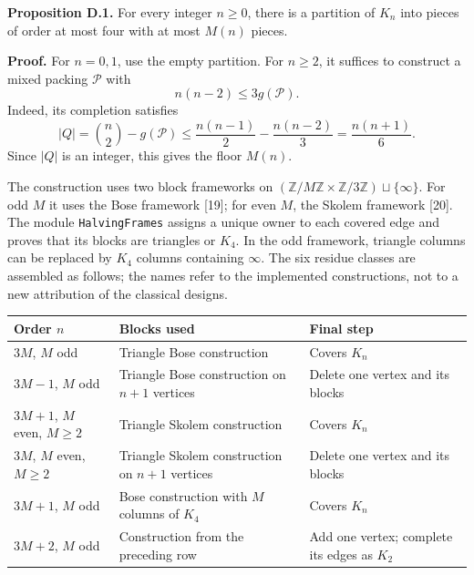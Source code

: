 \documentclass[english,11pt,a4paper]{article}
\newcounter{none}
\begin{document}
\textbf{Proposition D.1.} For every integer \(n\ge0\), there is a partition of \(K_n\) into pieces of order at most four with at most \(M(n)\) pieces.

\textbf{Proof.} For \(n=0,1\), use the empty partition. For \(n\ge2\), it suffices to construct a mixed packing \(\mathcal P\) with \[
n(n-2)\le3g(\mathcal P).
\tag{D.1}
\] Indeed, its completion satisfies \[
|Q|=\binom n2-g(\mathcal P)
\le\frac{n(n-1)}2-\frac{n(n-2)}3
=\frac{n(n+1)}6.
\tag{D.2}
\] Since \(|Q|\) is an integer, this gives the floor \(M(n)\).

The construction uses two block frameworks on \((\mathbb Z/M\mathbb Z\times\mathbb Z/3\mathbb Z)\sqcup\{\infty\}\). For odd \(M\) it uses the Bose framework {[}19{]}; for even \(M\), the Skolem framework {[}20{]}. The module \nolinkurl{HalvingFrames} assigns a unique owner to each covered edge and proves that its blocks are triangles or \(K_4\). In the odd framework, triangle columns can be replaced by \(K_4\) columns containing \(\infty\). The six residue classes are assembled as follows; the names refer to the implemented constructions, not to a new attribution of the classical designs.


{\def\LTcaptype{none} %
\begin{longtable}[c]{@{}
  >{\raggedright\arraybackslash}p{}
  >{\raggedright\arraybackslash}p{}
  >{\raggedright\arraybackslash}p{}@{}}
\toprule\noalign{}
\begin{minipage}[b]{\linewidth}\raggedright
Order \(n\)
\end{minipage} & \begin{minipage}[b]{\linewidth}\raggedright
Blocks used
\end{minipage} & \begin{minipage}[b]{\linewidth}\raggedright
Final step
\end{minipage} \\
\midrule\noalign{}
\endhead
\bottomrule\noalign{}
\endlastfoot
\(3M\), \(M\) odd & Triangle Bose construction & Covers \(K_n\) \\
\(3M-1\), \(M\) odd & Triangle Bose construction on \(n+1\) vertices & Delete one vertex and its blocks \\
\(3M+1\), \(M\) even, \(M\ge2\) & Triangle Skolem construction & Covers \(K_n\) \\
\(3M\), \(M\) even, \(M\ge2\) & Triangle Skolem construction on \(n+1\) vertices & Delete one vertex and its blocks \\
\(3M+1\), \(M\) odd & Bose construction with \(M\) columns of \(K_4\) & Covers \(K_n\) \\
\(3M+2\), \(M\) odd & Construction from the preceding row & Add one vertex; complete its edges as \(K_2\) \\
\end{longtable}
}
\end{document}

